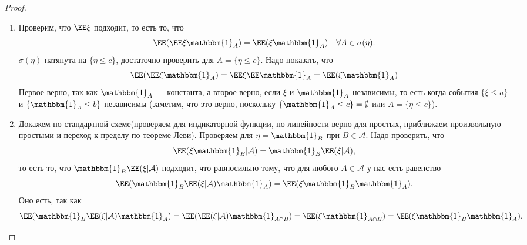 \begin{proof}
 \enewline
     \begin{enumerate}
         \item Проверим, что $\EE \xi$ подходит, то есть то, что 
         $$\EE (\EE \xi\mathbbm{1}_A) = \EE (\xi \mathbbm{1}_A) \quad \forall A\in \sigma(\eta).$$
               $\sigma(\eta)$ натянута на $\{\eta \le c\}$, достаточно проверить для $A = \{\eta \le c\}$.
               Надо показать, что
               $$\EE (\EE \xi\mathbbm{1}_A) = \EE \xi \EE \mathbbm{1}_A = \EE (\xi\mathbbm{1}_A)$$ 
               Первое верно, так как $\mathbbm{1}_A$ --- константа, а второе 
               верно, если $\xi $ и $\mathbbm{1}_A$ независимы, то есть когда события $\{\xi \le a\}$ и $\{\mathbbm{1}_A \le b\}$ независимы (заметим, что это верно, поскольку $\{\mathbbm{1}_A \le c\} = \emptyset$ или $A = \{\eta \le c\}$).

         \item Докажем по стандартной схеме(проверяем для индикаторной функции, по линейности верно для простых, приближаем произвольную простыми и переход к пределу по теореме Леви).
         Проверяем для $\eta = \mathbbm{1}_B$ при $B \in \mathcal{A}$. Надо проверить, что
               $$\EE (\xi\mathbbm{1}_B | \mathcal{A}) = \mathbbm{1}_B \EE (\xi | \mathcal{A}),$$ то есть то, что 
               $\mathbbm{1}_B \EE (\xi | \mathcal{A})$ подходит, что равносильно тому, что для любого $A\in \mathcal{A}$ у нас есть равенство
               $$\EE (\mathbbm{1}_B \EE (\xi | \mathcal{A}) \mathbbm{1}_A) = \EE (\xi \mathbbm{1}_B\mathbbm{1}_A).$$
               Оно есть, так как 
               $$\EE (\mathbbm{1}_B \EE (\xi | \mathcal{A}) \mathbbm{1}_A)  = \EE (\EE (\xi | \mathcal{A} ) \mathbbm{1}_{A\cap B}) = \EE (\xi\mathbbm{1}_{A\cap B}) = \EE (\xi \mathbbm{1}_B\mathbbm{1}_A).$$ \qedhere
     \end{enumerate}
 \end{proof}
